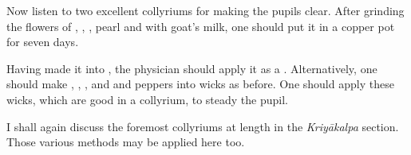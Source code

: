 \begin{translation}
    Now listen to two excellent collyriums for making the 
    pupils clear.  
After grinding the flowers of ,
,  
, pearl and  with goat's milk, 
one should put it in a copper pot for seven days.

\item[80cd--81]

Having made it into , the physician should apply it as a 
.  
Alternatively, one should make 
, 
,
, and 
and peppers into wicks as before.  One should apply these wicks, which are good in a 
collyrium, to steady the pupil. 

\item[82]

I shall again discuss the foremost collyriums at length in 
the \emph{Kriyākalpa} section. 
Those various methods may be applied here too. 
    
    
    \end{translation}
    
    
    
    
